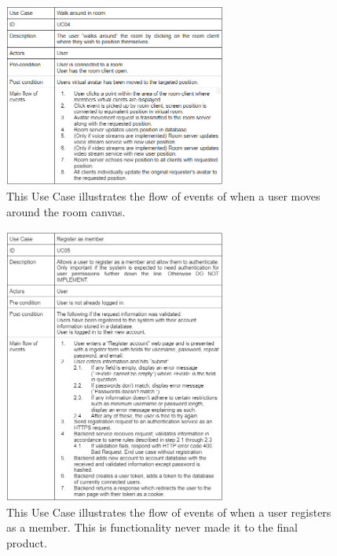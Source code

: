 \begin{figure}[H]
    \centering
    \includegraphics[width=0.65\textwidth]{Pictures/UseCaseMove.png}
    \caption{This Use Case illustrates the flow of events of when a user moves around the room canvas.}
    \label{fig:usecase4}
\end{figure}

\newpage

\begin{figure}[H]
    \centering
    \includegraphics[width=0.65\textwidth]{Pictures/UseCaseRegisterMember.png}
    \caption{This Use Case illustrates the flow of events of when a user registers as a member. This is functionality never made it to the final product.}
    \label{fig:usecase5}
\end{figure}

